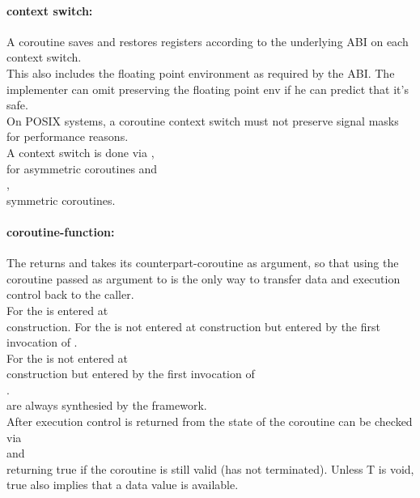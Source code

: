 \paragraph*{context switch:}
A coroutine saves and restores registers according to the underlying ABI on
each context switch.\\
\newline
This also includes the floating point environment as required by the ABI. The
implementer can omit preserving the floating point env if he can predict that
it's safe.\\
\newline
On POSIX systems, a coroutine context switch must not preserve signal masks for performance
reasons.\\
\newline
A context switch is done via \pushcoroop,\\
\pullcoroop for asymmetric coroutines and\\
\callcoroop,\\
\yieldcoroop symmetric coroutines.

\paragraph*{coroutine-function:}
The \corofunction returns  and takes its counterpart-coroutine as
argument, so that using the coroutine passed as argument to \corofunction is the
only way to transfer data and execution control back to the caller.\\
\newline
For \pullcoro the \corofunction is entered at\\
\pullcoro construction.
For \pushcoro the \corofunction is not entered at \pushcoro construction but
entered by the first invocation of \pushcoroop.\\
\newline
For \callcoro the \corofunction is not entered at\\
\callcoro construction but entered by the first invocation of\\
\callcoroop.\\
\yieldcoro are always synthesied by the framework.\\
After execution control is returned from \corofunction the state of the
coroutine can be checked via\\
\pullcorobool and\\
\callcorobool returning true if the coroutine is still valid (\corofunction has
not terminated). Unless T is void, true also implies that a data value is
available.

